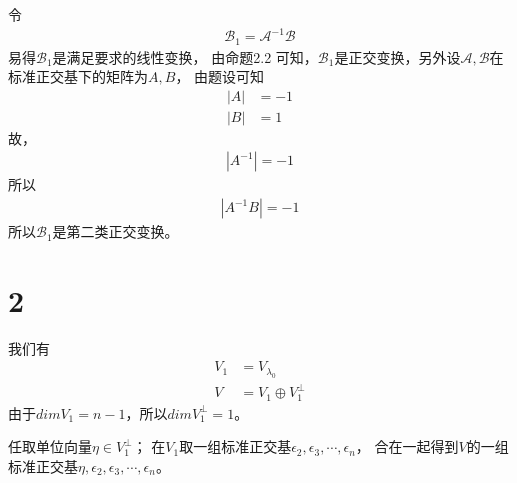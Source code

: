 \documentclass{article}
\begin{document}
\begin{itemize}
        令
        \begin{align*}
          \mathscr{B}_1 = \mathscr{A}^{-1} \mathscr{B}
        \end{align*}
        易得$\mathscr{B}_1$是满足要求的线性变换，
        由命题2.2 可知，$\mathscr{B}_1$是正交变换，另外设$\mathscr{A}, \mathscr{B}$在标准正交基下的矩阵为$A, B$，
        由题设可知
        \begin{align*}
          |A| & = -1 \\
          |B| & = 1
        \end{align*}
        故，
        \begin{align*}
          |A^{-1}| = -1
        \end{align*}
        所以
        \begin{align*}
          |A^{-1} B| = -1
        \end{align*}
        所以$\mathscr{B}_1$是第二类正交变换。

\end{itemize}

\section*{2}

我们有
\begin{align*}
  V_1 & = V_{\lambda_0}       \\
  V   & = V_1 \oplus V_1^\bot
\end{align*}
由于$dim V_1 = n - 1$，所以$dim V_1^\bot = 1$。

任取单位向量$\eta \in V_{1}^\bot$；
在$V_{1}$取一组标准正交基$\epsilon_2, \epsilon_3, \cdots, \epsilon_n$，
合在一起得到$V$的一组标准正交基$\eta, \epsilon_2, \epsilon_3, \cdots, \epsilon_n$。
\end{document}
